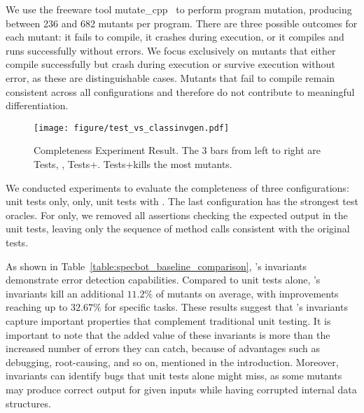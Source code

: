 We use the freeware tool mutate\_cpp~\cite{mutatecpp} to perform program mutation, producing between 236 and 682 mutants per program. There are three possible outcomes for each mutant: it fails to compile, it crashes  during execution, or it compiles and runs successfully without errors. 
We focus exclusively on mutants that either compile successfully but crash during execution or survive execution without error, as these are distinguishable cases. Mutants that fail to compile remain consistent across all configurations and therefore do not contribute to meaningful differentiation.

\begin{figure*}[t]
    \centering
    \texttt{[image: figure/test\_vs\_classinvgen.pdf]}  %
    \caption{Completeness Experiment Result. The 3 bars from left to right are Tests, \tech, Tests+\tech. Tests+\tech kills the most mutants.}
    \label{fig:mutation}
\end{figure*}


We conducted experiments to evaluate the completeness of three configurations: unit tests only, \tech only, unit tests with \tech. The last configuration has the strongest test oracles.
For \tech only, we removed all assertions checking the expected output in the unit tests, leaving only the sequence of method calls consistent with the original tests. 


As shown in Table~\ref{table:specbot_baseline_comparison}, \tech's invariants demonstrate error detection capabilities. Compared to unit tests alone, \tech's invariants kill an additional $11.2\%$ of mutants on average, with improvements reaching up to $32.67\%$ for specific tasks. These results suggest that \tech's invariants capture important properties that complement traditional unit testing.
It is important to note that the added value of these invariants is more than the increased number of errors they can catch, because of advantages such as debugging, root-causing, and so on, mentioned in the introduction. Moreover, invariants can identify bugs that unit tests alone might miss, as some mutants may produce correct output for given inputs while having corrupted internal data structures.

